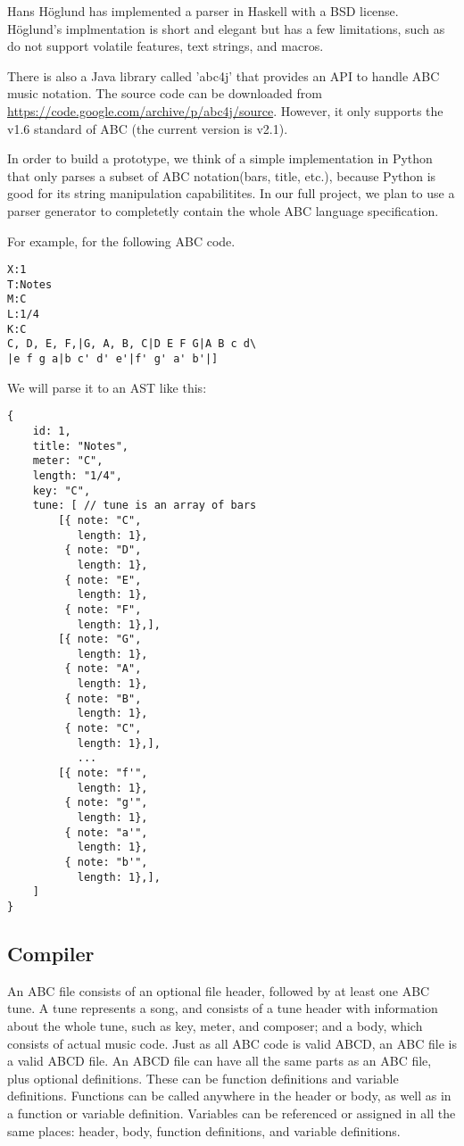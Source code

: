 Hans H\"{o}glund has implemented a parser in Haskell\cite{Hoglund15} with a BSD license. H\"{o}glund's implmentation is short and elegant but has a few limitations, such as do not support volatile features, text strings, and macros.

There is also a Java library called 'abc4j' that provides an API to handle ABC music notation. The source code can be downloaded from \url{https://code.google.com/archive/p/abc4j/source}. However, it only supports the v1.6 standard of ABC (the current version is v2.1).

In order to build a prototype, we think of a simple implementation in Python that only parses a subset of ABC notation(bars, title, etc.), because Python is good for its string manipulation capabilitites. In our full project, we plan to use a parser generator to completetly contain the whole ABC language specification. 

For example, for the following ABC code.
\begin{verbatim}
X:1
T:Notes
M:C
L:1/4
K:C
C, D, E, F,|G, A, B, C|D E F G|A B c d\
|e f g a|b c' d' e'|f' g' a' b'|]
\end{verbatim}

We will parse it to an AST like this:
\begin{verbatim}
{
	id: 1,
	title: "Notes",
	meter: "C",
	length: "1/4",
	key: "C",
	tune: [ // tune is an array of bars
	    [{ note: "C",
	       length: 1},
	     { note: "D",
	       length: 1},
	     { note: "E",
	       length: 1},
	     { note: "F",
	       length: 1},],
	    [{ note: "G",
	       length: 1},
	     { note: "A",
	       length: 1},
	     { note: "B",
	       length: 1},
	     { note: "C",
	       length: 1},],
	       ...
	    [{ note: "f'",
	       length: 1},
	     { note: "g'",
	       length: 1},
	     { note: "a'",
	       length: 1},
	     { note: "b'",
	       length: 1},],
	]
}
\end{verbatim}

\subsection{Compiler}
An ABC file consists of an optional file header, followed by at least one ABC tune. A tune represents a song, and consists of a tune header with information about the whole tune, such as key, meter, and composer; and a body, which consists of actual music code\cite{Walshaw11}. Just as all ABC code is valid ABCD, an ABC file is a valid ABCD file. An ABCD file can have all the same parts as an ABC file, plus optional definitions. These can be function definitions and variable definitions. Functions can be called anywhere in the header or body, as well as in a function or variable definition. Variables can be referenced or assigned in all the same places: header, body, function definitions, and variable definitions.
	
